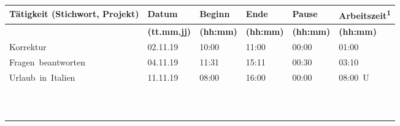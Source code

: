 \documentclass[]{scrartcl}
\begin{document}
	\large
	\begin{center}
		\begin{tabular}{| P{6.7cm} | P{2cm} | P{1.8cm} | P{1.8cm} | P{1.8cm} | P{2.4cm} |}
			\hline
			\textbf{T\"atigkeit (Stichwort, Projekt)}
			& \textbf{Datum}
			& \textbf{Beginn}
			& \textbf{Ende}
			& \textbf{Pause}
			& \textbf{Arbeitszeit\textsuperscript{1}}\\
			\hline
			& \textbf{(tt.mm.jj)}
			& \textbf{(hh:mm)}
			& \textbf{(hh:mm)}
			& \textbf{(hh:mm)}
			& \textbf{(hh:mm)}\\
			\hline
			\mbox{Korrektur}
			& \mbox{02.11.19}
			& \mbox{10:00}
			& \mbox{11:00}
			& \mbox{00:00}
			& \mbox{01:00}\\
			\hline
			\mbox{Fragen beantworten}
			& \mbox{04.11.19}
			& \mbox{11:31}
			& \mbox{15:11}
			& \mbox{00:30}
			& \mbox{03:10}\\
			\hline
			\mbox{Urlaub in Italien}
			& \mbox{11.11.19}
			& \mbox{08:00}
			& \mbox{16:00}
			& \mbox{00:00}
			& \mbox{08:00 U}\\
			\hline
			\mbox{}
			& \mbox{}
			& \mbox{}
			& \mbox{}
			& \mbox{}
			& \mbox{}\\
			\hline
			\mbox{}
			& \mbox{}
			& \mbox{}
			& \mbox{}
			& \mbox{}
			& \mbox{}\\
			\hline
			\mbox{}
			& \mbox{}
			& \mbox{}
			& \mbox{}
			& \mbox{}
			& \mbox{}\\
			\hline
			\mbox{}
			& \mbox{}
			& \mbox{}
			& \mbox{}
			& \mbox{}
			& \mbox{}\\
			\hline
			\mbox{}
			& \mbox{}
			& \mbox{}
			& \mbox{}
			& \mbox{}
			& \mbox{}\\
			\hline
			\mbox{}
			& \mbox{}
			& \mbox{}
			& \mbox{}
			& \mbox{}
			& \mbox{}\\
			\hline
			\mbox{}
			& \mbox{}
			& \mbox{}
			& \mbox{}
			& \mbox{}
			& \mbox{}\\
			\hline
			\mbox{}
			& \mbox{}
			& \mbox{}
			& \mbox{}
			& \mbox{}
			& \mbox{}\\
			\hline
			\mbox{}
			& \mbox{}
			& \mbox{}
			& \mbox{}
			& \mbox{}
			& \mbox{}\\
			\hline
			\mbox{}
			& \mbox{}
			& \mbox{}
			& \mbox{}
			& \mbox{}
			& \mbox{}\\
			\hline
			\mbox{}
			& \mbox{}

\end{tabular}
\end{center}
\end{document}
